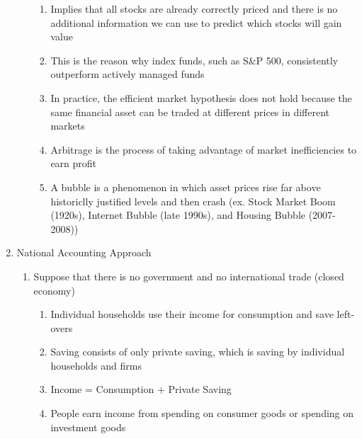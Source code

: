 \documentclass[12pt]{article}
\begin{document}
\begin{enumerate}
\begin{enumerate}
\begin{enumerate}
              \item Implies that all stocks are already correctly priced and there is no additional information we can use to predict which stocks will gain value

              \item This is the reason why index funds, such as S\&P 500, consistently outperform actively managed funds

              \item In practice, the efficient market hypothesis does not hold because the same financial asset can be traded at different prices in different markets

              \item Arbitrage is the process of taking advantage of market inefficiencies to earn profit

              \item A bubble is a phenomenon in which asset prices rise far above historiclly justified levels and then crash (ex. Stock Market Boom (1920s), Internet Bubble (late 1990s), and Housing Bubble (2007-2008))

            \end{enumerate}

        \end{enumerate}

      \item National Accounting Approach

        \begin{enumerate}

          \item Suppose that there is no government and no international trade (closed economy)

            \begin{enumerate}

              \item Individual households use their income for consumption and save left-overs

              \item Saving consists of only private saving, which is saving by individual households and firms

              \item Income = Consumption + Private Saving

              \item People earn income from spending on consumer goods or spending on investment goods


\end{enumerate}
\end{enumerate}
\end{enumerate}
\end{document}
